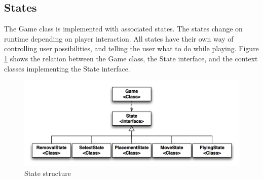 \subsection{States}

The Game class is implemented with associated states. The states change on runtime depending on player interaction. All states have their own way of controlling user possibilities, and telling the user what to do while playing. Figure \ref{fig:states} shows the relation between the Game class, the State interface, and the context classes implementing the State interface.

\begin{figure}[H]
\begin{center}
\includegraphics[width=\textwidth]{Images/states}
\caption{State structure}
\label{fig:states}
\end{center}
\end{figure}

